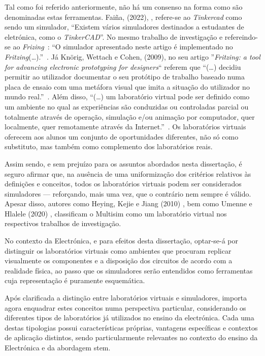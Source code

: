 Tal como foi referido anteriormente, não há um consenso na forma como são denominadas estas ferramentas. Faiña, (2022), \cite{faina}, refere-se ao \textit{Tinkercad} como sendo um simulador, ``Existem vários simuladores destinados a estudantes de eletrónica, como o \textit{TinkerCAD}''. No mesmo trabalho de investigação e refereindo-se ao \textit{Frizing}~\cite{fritzingdown}: ``O simulador apresentado neste artigo é implementado no \textit{Fritzing}(\ldots).''~\cite{faina}. Já Knörig, Wettach e Cohen, (2009), no seu artigo ''\textit{Fritzing: a tool for advancing electronic prototyping for designers}`` referem que ``(\ldots) decidiu permitir ao utilizador documentar o seu protótipo de trabalho baseado numa placa de ensaio com uma metáfora visual que imita a situação do utilizador no mundo real.''~\cite{Knorig2009Feb}. Além disso, ``(\ldots) um laboratório virtual pode ser definido como um ambiente no qual as experiências são conduzidas ou controladas parcial ou totalmente através de operação, simulação e/ou animação por computador, quer localmente, quer remotamente através da Internet.''~\cite{EvaluatingLearningExperiencesVirtualLaboratoryHongKong}. Os laboratórios virtuais oferecem aos alunos um conjunto de oportunidades diferentes, não só como substituto, mas também como complemento dos laboratórios reais.

Assim sendo, e sem prejuízo para os assuntos abordados nesta dissertação, é seguro afirmar que, na ausência de uma uniformização dos critérios relativos às definições e conceitos, todos os laboratórios virtuais podem ser considerados simuladores — reforçando, mais uma vez, que o contrário nem sempre é válido. Apesar disso, autores como Heying, Kejie e Jiang (2010) \cite{multisimVLHeying}, bem como Umenne e Hlalele (2020) \cite{multisimVLUmenne}, classificam o Multisim \cite{multisim} como um laboratório virtual nos respectivos trabalhos de investigação.

No contexto da Electrónica, e para efeitos desta dissertação, optar-se-á por distinguir os laboratórios virtuais como ambientes que procuram replicar visualmente os componentes e a disposição dos circuitos de acordo com a realidade física, ao passo que os simuladores serão entendidos como ferramentas cuja representação é puramente esquemática.

Após clarificada a distinção entre laboratórios virtuais e simuladores, importa agora enquadrar estes conceitos numa perspectiva particular, considerando os diferentes tipos de laboratórios já utilizados no ensino da electrónica. Cada uma destas tipologias possui características próprias, vantagens específicas e contextos de aplicação distintos, sendo particularmente relevantes no contexto do ensino da Electrónica e da abordagem \acrshort{stem}.

